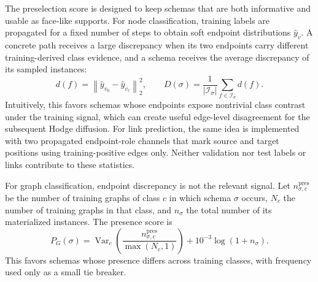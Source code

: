 \documentclass[sigconf,anonymous,review]{acmart}
\newcommand{\norm}[1]{\left\lVert #1\right\rVert}
\begin{document}
The preselection score is designed to keep schemas that are both informative and usable as
face-like supports.  For node classification, training labels are propagated for a fixed number of
steps to obtain soft endpoint distributions \(\widehat y_v\).  A concrete path receives a large
discrepancy when its two endpoints carry different training-derived class evidence, and a schema
receives the average discrepancy of its sampled instances:
\begin{equation}
  d(f)=\norm{\widehat y_{v_0}-\widehat y_{v_\ell}}_2^2,
  \qquad
  D(\sigma)=\frac{1}{|\mathcal{I}_{\sigma}|}
  \sum_{f\in\mathcal{I}_{\sigma}}d(f).
  \label{eq:discrepancy}
\end{equation}
Intuitively, this favors schemas whose endpoints expose nontrivial class contrast under the
training signal, which can create useful edge-level disagreement for the subsequent Hodge diffusion.
For link prediction, the same idea is implemented with two propagated endpoint-role channels that
mark source and target positions using training-positive edges only.  Neither validation nor test
labels or links contribute to these statistics.

For graph classification, endpoint discrepancy is not the relevant signal.  Let
\(n_{\sigma,c}^{\mathrm{pres}}\) be the number of training graphs of class \(c\) in which schema
\(\sigma\) occurs, \(N_c\) the number of training graphs in that class, and \(n_\sigma\) the total
number of its materialized instances.  The presence score is
\begin{equation}
  P_G(\sigma)
  =\operatorname{Var}_{c}\!\left(
    \frac{n_{\sigma,c}^{\mathrm{pres}}}{\max(N_c,1)}
  \right)+10^{-3}\log(1+n_\sigma).
  \label{eq:graph-presence-score}
\end{equation}
This favors schemas whose presence differs across training classes, with frequency used only as a
small tie breaker.
\end{document}
